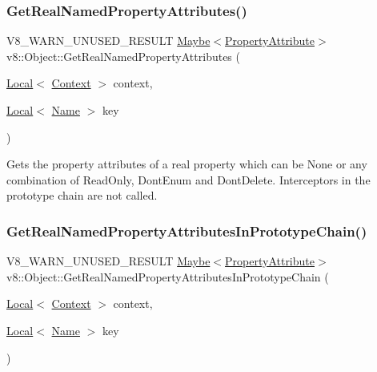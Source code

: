 \subsubsection{\texorpdfstring{Get\+Real\+Named\+Property\+Attributes()}{GetRealNamedPropertyAttributes()}}
{\footnotesize\ttfamily V8\+\_\+\+W\+A\+R\+N\+\_\+\+U\+N\+U\+S\+E\+D\+\_\+\+R\+E\+S\+U\+LT \mbox{\hyperlink{classv8_1_1Maybe}{Maybe}}$<$\mbox{\hyperlink{namespacev8_a05f25f935e108a1ea2d150e274602b87}{Property\+Attribute}}$>$ v8\+::\+Object\+::\+Get\+Real\+Named\+Property\+Attributes (\begin{DoxyParamCaption}\item[{\mbox{\hyperlink{classv8_1_1Local}{Local}}$<$ \mbox{\hyperlink{classv8_1_1Context}{Context}} $>$}]{context,  }\item[{\mbox{\hyperlink{classv8_1_1Local}{Local}}$<$ \mbox{\hyperlink{classv8_1_1Name}{Name}} $>$}]{key }\end{DoxyParamCaption})}

Gets the property attributes of a real property which can be None or any combination of Read\+Only, Dont\+Enum and Dont\+Delete. Interceptors in the prototype chain are not called. \mbox{\label{classv8_1_1Object_aab7c2e5c5659e95e97488e01b04bf3c8}} 
\subsubsection{\texorpdfstring{Get\+Real\+Named\+Property\+Attributes\+In\+Prototype\+Chain()}{GetRealNamedPropertyAttributesInPrototypeChain()}}
{\footnotesize\ttfamily V8\+\_\+\+W\+A\+R\+N\+\_\+\+U\+N\+U\+S\+E\+D\+\_\+\+R\+E\+S\+U\+LT \mbox{\hyperlink{classv8_1_1Maybe}{Maybe}}$<$\mbox{\hyperlink{namespacev8_a05f25f935e108a1ea2d150e274602b87}{Property\+Attribute}}$>$ v8\+::\+Object\+::\+Get\+Real\+Named\+Property\+Attributes\+In\+Prototype\+Chain (\begin{DoxyParamCaption}\item[{\mbox{\hyperlink{classv8_1_1Local}{Local}}$<$ \mbox{\hyperlink{classv8_1_1Context}{Context}} $>$}]{context,  }\item[{\mbox{\hyperlink{classv8_1_1Local}{Local}}$<$ \mbox{\hyperlink{classv8_1_1Name}{Name}} $>$}]{key }\end{DoxyParamCaption})}

